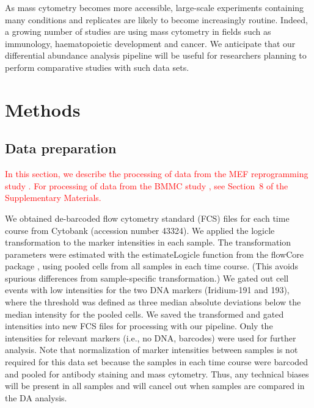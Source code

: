 \documentclass{article}
\newcommand\revised[1]{\textcolor{red}{#1}}
\newcommand{\suppbmmc}{8}
\begin{document}
As mass cytometry becomes more accessible, large-scale experiments containing many conditions and replicates are likely to become increasingly routine.
Indeed, a growing number of studies are using mass cytometry in fields such as immunology, haematopoietic development and cancer.
We anticipate that our differential abundance analysis pipeline will be useful for researchers planning to perform comparative studies with such data sets.


\section{Methods}

\subsection{Data preparation}
\revised{In this section, we describe the processing of data from the MEF reprogramming study \cite{zunder2015continuous}.
For processing of data from the BMMC study \cite{levine2015datadriven}, see Section~\suppbmmc{} of the Supplementary Materials.}

We obtained de-barcoded flow cytometry standard (FCS) files for each time course from Cytobank \cite{kotecha2010web} (accession number 43324).
We applied the logicle transformation \cite{parks2006new} to the marker intensities in each sample.
The transformation parameters were estimated with the estimateLogicle function from the flowCore package \cite{hahne2009flowcore}, using pooled cells from all samples in each time course.
(This avoids spurious differences from sample-specific transformation.)
We gated out cell events with low intensities for the two DNA markers (Iridium-191 and 193), where the threshold was defined as three median absolute deviations below the median intensity for the pooled cells.
We saved the transformed and gated intensities into new FCS files for processing with our pipeline.
Only the intensities for relevant markers (i.e., no DNA, barcodes) were used for further analysis.
Note that normalization of marker intensities between samples is not required for this data set because the samples in each time course were barcoded and pooled for antibody staining and mass cytometry.
Thus, any technical biases will be present in all samples and will cancel out when samples are compared in the DA analysis.
\end{document}
